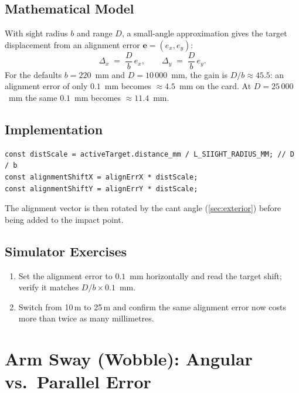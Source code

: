\documentclass[11pt]{article}
\begin{document}
\subsection{Mathematical Model}

With sight radius $b$ and range $D$, a small-angle approximation gives the
target displacement from an alignment error $\mathbf{e}=(e_x,e_y)$:
\begin{equation}
  \Delta_x \;=\; \frac{D}{b}\,e_x, \qquad
  \Delta_y \;=\; \frac{D}{b}\,e_y .
  \label{eq:align}
\end{equation}
For the defaults $b = 220$~mm and $D = 10\,000$~mm, the gain is
$D/b \approx 45.5$: an alignment error of only $0.1$~mm becomes
$\approx 4.5$~mm on the card.  At $D=25\,000$~mm the same $0.1$~mm becomes
$\approx 11.4$~mm.

\subsection{Implementation}

\begin{lstlisting}
const distScale = activeTarget.distance_mm / L_SIIGHT_RADIUS_MM; // D / b
const alignmentShiftX = alignErrX * distScale;
const alignmentShiftY = alignErrY * distScale;
\end{lstlisting}

The alignment vector is then rotated by the cant angle (\cref{sec:exterior})
before being added to the impact point.

\subsection{Simulator Exercises}

\begin{enumerate}[nosep]
  \item Set the alignment error to $0.1$~mm horizontally and read the
        target shift; verify it matches $D/b \times 0.1$~mm.
  \item Switch from 10\,m to 25\,m and confirm the same alignment error
        now costs more than twice as many millimetres.
\end{enumerate}

\section{Arm Sway (Wobble): Angular vs.\ Parallel Error}\label{sec:wobble}
\end{document}
